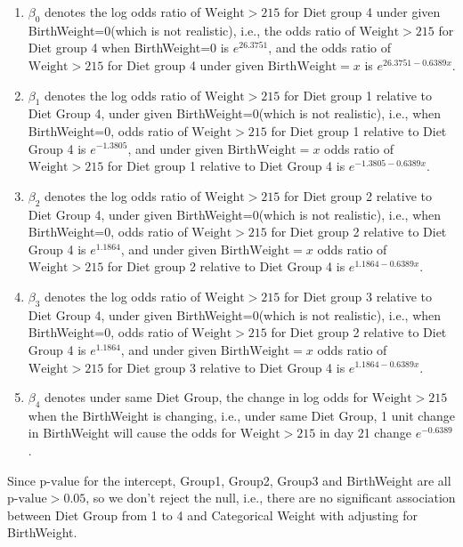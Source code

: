 \documentclass[10pt,letterpaper]{article}
\begin{document}
\begin{enumerate}[leftmargin=0cm,itemindent=.5cm,labelwidth=\itemindent,labelsep=0cm,align=left]
\begin{enumerate}[leftmargin=0cm,itemindent=.5cm,labelwidth=\itemindent,labelsep=0cm,align=left]
\item[\textbullet] $\beta_0$ denotes the log odds ratio of $\text{Weight}>215$ for Diet group 4 under given BirthWeight=0(which is not realistic), i.e., the odds ratio of $\text{Weight}>215$ for Diet group 4 when BirthWeight=0 is $e^{26.3751}$, and the odds ratio of $\text{Weight}>215$ for Diet group 4 under given $\text{BirthWeight}=x$ is $e^{26.3751-0.6389x}$.
\item[\textbullet] $\beta_1$ denotes the log odds ratio of $\text{Weight}>215$ for Diet group 1 relative to Diet Group 4, under given BirthWeight=0(which is not realistic), i.e., when BirthWeight=0, odds ratio of $\text{Weight}>215$ for Diet group 1 relative to Diet Group 4 is $e^{-1.3805}$, and under given $\text{BirthWeight}=x$ odds ratio of $\text{Weight}>215$ for Diet group 1 relative to Diet Group 4 is $e^{-1.3805-0.6389x}$.
\item[\textbullet] $\beta_2$ denotes the log odds ratio of $\text{Weight}>215$ for Diet group 2 relative to Diet Group 4, under given BirthWeight=0(which is not realistic), i.e., when BirthWeight=0, odds ratio of $\text{Weight}>215$ for Diet group 2 relative to Diet Group 4 is $e^{1.1864}$, and under given $\text{BirthWeight}=x$ odds ratio of $\text{Weight}>215$ for Diet group 2 relative to Diet Group 4 is $e^{1.1864-0.6389x}$.
\item[\textbullet] $\beta_3$ denotes the log odds ratio of $\text{Weight}>215$ for Diet group 3 relative to Diet Group 4, under given BirthWeight=0(which is not realistic), i.e., when BirthWeight=0, odds ratio of $\text{Weight}>215$ for Diet group 2 relative to Diet Group 4 is $e^{1.1864}$, and under given $\text{BirthWeight}=x$ odds ratio of $\text{Weight}>215$ for Diet group 3 relative to Diet Group 4 is $e^{1.1864-0.6389x}$.
\item[\textbullet] $\beta_4$ denotes under same Diet Group, the change in log odds for $\text{Weight}>215$ when the BirthWeight is changing, i.e., under same Diet Group, 1 unit change in BirthWeight will cause the odds for $\text{Weight}>215$ in day 21 change $e^{-0.6389}$.
\end{enumerate}
Since $\text{p-value}$ for the intercept, Group1, Group2, Group3 and BirthWeight are all $\text{p-value}>0.05$, so we don't reject the null, i.e., there are no significant association between Diet Group from 1 to 4 and Categorical Weight with adjusting for BirthWeight. 
\end{enumerate}
\end{document}
